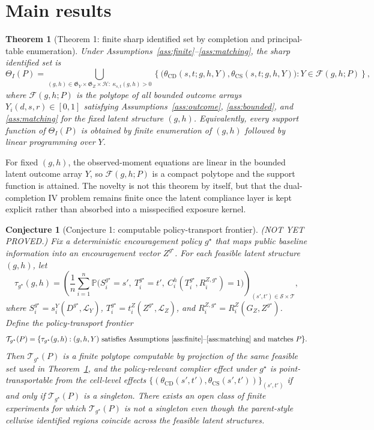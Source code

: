 \documentclass[11pt]{article}
\renewcommand{\Pr}{\mathbb{P}}
\newcommand{\calH}{\mathcal{H}}
\newcommand{\calF}{\mathcal{F}}
\theoremstyle{definition}
\theoremstyle{plain}
\newtheorem{theorem}{Theorem}
\newtheorem{conjecture}{Conjecture}
\theoremstyle{remark}
\begin{document}
\section{Main results}
\begin{theorem}[Theorem 1: finite sharp identified set by completion and principal-table enumeration]\label{thm:finite-sharp}
Under Assumptions~\ref{ass:finite}--\ref{ass:matching}, the sharp identified set is
\[
\Theta_I(P)
=
\bigcup_{(g,h)\in\mathfrak G_Y\times\mathfrak G_Z\times\calH:\ \kappa_{s,t}(g,h)>0}
\left\{
\big(\theta_{\mathrm{CD}}(s,t;g,h,Y),\theta_{\mathrm{CS}}(s,t;g,h,Y)\big):
Y\in\calF(g,h;P)
\right\},
\]
where \(\calF(g,h;P)\) is the polytope of all bounded outcome arrays \(Y_i(d,s,r)\in[0,1]\) satisfying Assumptions~\ref{ass:outcome}, \ref{ass:bounded}, and \ref{ass:matching} for the fixed latent structure \((g,h)\). Equivalently, every support function of \(\Theta_I(P)\) is obtained by finite enumeration of \((g,h)\) followed by linear programming over \(Y\).
\end{theorem}
For fixed \((g,h)\), the observed-moment equations are linear in the bounded latent outcome array \(Y\), so \(\calF(g,h;P)\) is a compact polytope and the support function is attained. The novelty is not this theorem by itself, but that the dual-completion IV problem remains finite once the latent compliance layer is kept explicit rather than absorbed into a misspecified exposure kernel.

\begin{conjecture}[Conjecture 1: computable policy-transport frontier]\label{conj:frontier}
(NOT YET PROVED.) Fix a deterministic encouragement policy \(g^\star\) that maps public baseline information into an encouragement vector \(Z^{g^\star}\). For each feasible latent structure \((g,h)\), let
\[
\tau_{g^\star}(g,h)
=
\left(
\frac1n\sum_{i=1}^n
\Pr\!\big(S_i^{g^\star}=s',\ T_i^{g^\star}=t',\ C_i^{h}(T_i^{g^\star},R_i^{Z,g^\star})=1\big)
\right)_{(s',t')\in\mathcal S\times\mathcal T},
\]
where \(S_i^{g^\star}=s_i^Y(D^{g^\star},\mathcal L_Y)\), \(T_i^{g^\star}=t_i^Z(Z^{g^\star},\mathcal L_Z)\), and \(R_i^{Z,g^\star}=R_i^Z(G_Z,Z^{g^\star})\). Define the policy-transport frontier
\[
\mathcal T_{g^\star}(P)
=
\{\tau_{g^\star}(g,h):(g,h,Y)\text{ satisfies Assumptions~\ref{ass:finite}--\ref{ass:matching} and matches }P\}.
\]
Then \(\mathcal T_{g^\star}(P)\) is a finite polytope computable by projection of the same feasible set used in Theorem~\ref{thm:finite-sharp}, and the policy-relevant complier effect under \(g^\star\) is point-transportable from the cell-level effects \(\{(\theta_{\mathrm{CD}}(s',t'),\theta_{\mathrm{CS}}(s',t'))\}_{(s',t')}\) if and only if \(\mathcal T_{g^\star}(P)\) is a singleton. There exists an open class of finite experiments for which \(\mathcal T_{g^\star}(P)\) is not a singleton even though the parent-style cellwise identified regions coincide across the feasible latent structures.
\end{conjecture}
\end{document}
